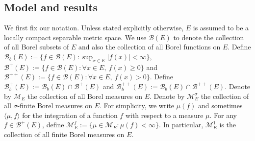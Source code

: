 \documentclass[12pt,a4paper]{amsart}
\theoremstyle{definition}
\numberwithin{equation}{section}
\begin{document}
\subsection{Model and results}

We first fix our notation.
Unless stated explicitly otherwise, $E$ is assumed to be a locally compact separable metric space. 
We use $\mathscr B(E)$ to denote the collection of all  Borel subsets of $E$ and also the collection of all  Borel functions on $E$. Define $\mathscr B_b(E) :=\{f \in \mathscr B(E): \sup_{x\in E}|f(x)|<\infty \}$, $\mathscr B^+(E) :=\{f\in \mathscr B(E): \forall x\in E,~f(x)\geq 0\}$ and $\mathscr B^{++}(E) :=\{f\in \mathscr B(E): \forall x\in E,~f(x)> 0\}$.
Define $\mathscr B^+_b(E) := \mathscr B_b(E) \cap \mathscr B^+(E)$ and $\mathscr B^{++}_b(E):= \mathscr B_b(E) \cap \mathscr B^{++}(E)$.
Denote by $\mathcal M_E$ the collection of all Borel measures on $E$.
Denote by $\mathcal M^\sigma_E$ the collection of all  $\sigma$-finite Borel measures on $E$.
For simplicity, we write $\mu(f)$ and sometimes $\langle \mu, f\rangle$ for the integration of a function $f$ with respect to a measure $\mu$.
For any $f \in \mathscr B^+(E)$, define $\mathcal M^f_E:= \{\mu \in \mathcal M_E: \mu(f) < \infty\}$. In particular, $\mathcal M^1_E$ is the collection of all  finite Borel measures on $E$.
	
\end{document}
